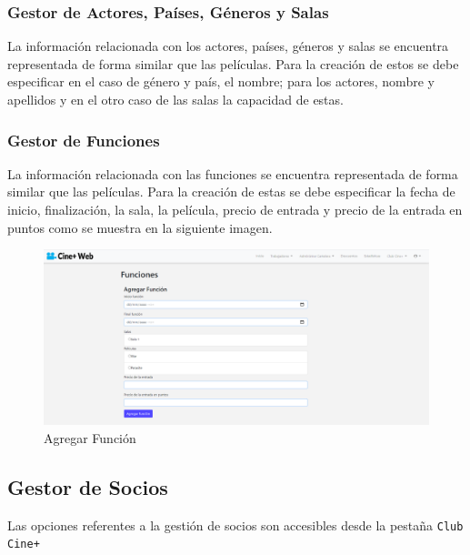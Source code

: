 \subsubsection{Gestor de Actores, Pa\'ises, G\'eneros y Salas }

La informaci\'on relacionada con los actores, pa\'ises, g\'eneros y salas se encuentra representada de forma similar que las pel\'iculas. Para la creaci\'on de estos se debe especificar en el caso de g\'enero y pa\'is, el nombre; para los actores, nombre y apellidos y en el otro caso de las salas la capacidad de estas.

\subsubsection{Gestor de Funciones}
La informaci\'on relacionada con las funciones se encuentra representada de forma similar que las pel\'iculas. Para la creaci\'on de estas se debe especificar la fecha de inicio, finalizaci\'on, la sala, la pel\'icula, precio de entrada y precio de la entrada en puntos como se muestra en la siguiente imagen.

\begin{figure}[h!]
	\centering
	\includegraphics[scale=0.35]{./chapters/img/add_function.png}
	
	\label{fig:add_function}
	\caption{Agregar Funci\'on}
	
\end{figure}

\subsection{Gestor de Socios}
Las opciones referentes a la gesti\'on de socios son accesibles desde la pesta\~na \verb*|Club| \verb*|Cine+| 

